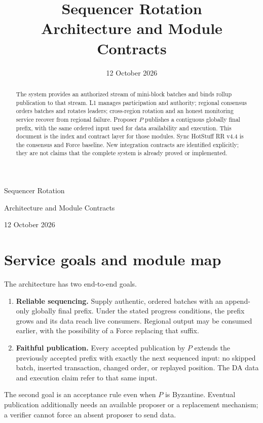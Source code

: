 \documentclass[11pt,a4paper]{article}
\title{Sequencer Rotation\\[3pt]\large Architecture and Module Contracts}
\author{}\date{12 October 2026}
\begin{document}
\begin{center}
{\LARGE Sequencer Rotation\par}\vspace{5pt}
{\large Architecture and Module Contracts\par}\vspace{8pt}
12 October 2026
\end{center}
\begin{abstract}
The system provides an authorized stream of mini-block batches and binds
rollup publication to that stream. L1 manages participation and authority;
regional consensus orders batches and rotates leaders; cross-region
rotation and an honest monitoring service recover from regional failure.
Proposer $P$ publishes a contiguous globally final prefix, with the same
ordered input used for data availability and execution. This document is
the index and contract layer for those modules. Sync HotStuff RR v4.4 is
the consensus and Force baseline. New integration contracts are identified
explicitly; they are not claims that the complete system is already proved
or implemented.
\end{abstract}

\section{Service goals and module map}\label{sec:map}
The architecture has two end-to-end goals.
\begin{enumerate}
\item \textbf{Reliable sequencing.} Supply authentic, ordered batches with
an append-only globally final prefix. Under the stated progress conditions,
the prefix grows and its data reach live consumers. Regional output may be
consumed earlier, with the possibility of a Force replacing that suffix.
\item \textbf{Faithful publication.} Every accepted publication by $P$
extends the previously accepted prefix with exactly the next sequenced
input: no skipped batch, inserted transaction, changed order, or replayed
position. The DA data and execution claim refer to that same input.
\end{enumerate}
The second goal is an acceptance rule even when $P$ is Byzantine. Eventual
publication additionally needs an available proposer or a replacement
mechanism; a verifier cannot force an absent proposer to send data.
\end{document}
